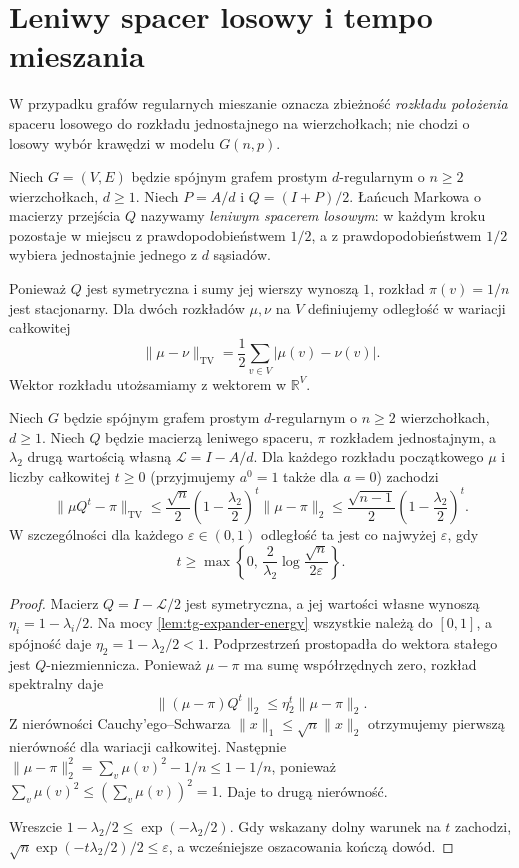 \section{Leniwy spacer losowy i tempo mieszania}
\label{sec:tg-expanders-random-walk}

W przypadku grafów regularnych mieszanie oznacza
zbieżność \emph{rozkładu położenia} spaceru losowego
do rozkładu jednostajnego na wierzchołkach;
nie chodzi o losowy wybór krawędzi
w modelu $G(n,p)$.

\begin{definicja}
\label{def:tg-expander-lazy-walk}
Niech $G=(V,E)$ będzie spójnym grafem
prostym $d$-regularnym o $n\geq2$
wierzchołkach, $d\geq1$.
Niech $P=A/d$ i
$Q=(I+P)/2$.
Łańcuch Markowa o macierzy przejścia
$Q$ nazywamy \emph{leniwym spacerem losowym}:
w każdym kroku pozostaje w miejscu
z prawdopodobieństwem $1/2$,
a z prawdopodobieństwem $1/2$
wybiera jednostajnie jednego
z $d$ sąsiadów.
\end{definicja}

Ponieważ $Q$ jest symetryczna
i sumy jej wierszy wynoszą $1$,
rozkład $\pi(v)=1/n$ jest
stacjonarny. Dla dwóch rozkładów
$\mu,\nu$ na $V$ definiujemy
odległość w wariacji całkowitej
\[
\|\mu-\nu\|_{\mathrm{TV}}
=\frac12\sum_{v\in V}|\mu(v)-\nu(v)|.
\]
Wektor rozkładu utożsamiamy
z wektorem w $\mathbb R^V$.

\begin{twierdzenie}
\label{thm:tg-expander-mixing}
Niech $G$ będzie spójnym grafem
prostym $d$-regularnym o $n\geq2$
wierzchołkach, $d\geq1$.
Niech $Q$ będzie macierzą
leniwego spaceru, $\pi$
rozkładem jednostajnym, a
$\lambda_2$ drugą wartością
własną $\mathcal L=I-A/d$.
Dla każdego rozkładu początkowego
$\mu$ i liczby całkowitej $t\geq0$
(przyjmujemy $a^0=1$ także dla $a=0$)
zachodzi
\[
\|\mu Q^t-\pi\|_{\mathrm{TV}}
\leq\frac{\sqrt n}{2}
\left(1-\frac{\lambda_2}{2}\right)^t
\|\mu-\pi\|_2
\leq\frac{\sqrt{n-1}}2
\left(1-\frac{\lambda_2}{2}\right)^t.
\]
W szczególności dla każdego
$\varepsilon\in(0,1)$
odległość ta jest co najwyżej
$\varepsilon$, gdy
\[
t\geq\max\left\{0,\,
\frac2{\lambda_2}
\log\frac{\sqrt n}{2\varepsilon}\right\}.
\]
\end{twierdzenie}
\begin{proof}
Macierz $Q=I-\mathcal L/2$
jest symetryczna, a jej
wartości własne wynoszą
$\eta_i=1-\lambda_i/2$.
Na mocy
\ref{lem:tg-expander-energy}
wszystkie należą do $[0,1]$,
a spójność daje
$\eta_2=1-\lambda_2/2<1$.
Podprzestrzeń prostopadła
do wektora stałego jest
$Q$-niezmiennicza.
Ponieważ $\mu-\pi$
ma sumę współrzędnych zero,
rozkład spektralny daje
\[
\|(\mu-\pi)Q^t\|_2
\leq\eta_2^t\|\mu-\pi\|_2.
\]
Z nierówności Cauchy'ego--Schwarza
$\|x\|_1\leq\sqrt n\|x\|_2$
otrzymujemy pierwszą nierówność
dla wariacji całkowitej.
Następnie
$\|\mu-\pi\|_2^2
=\sum_v\mu(v)^2-1/n
\leq1-1/n$,
ponieważ $\sum_v\mu(v)^2
\leq(\sum_v\mu(v))^2=1$.
Daje to drugą nierówność.

Wreszcie
$1-\lambda_2/2
\leq\exp(-\lambda_2/2)$.
Gdy wskazany dolny warunek
na $t$ zachodzi,
$\sqrt n\exp(-t\lambda_2/2)/2
\leq\varepsilon$,
a wcześniejsze oszacowania
kończą dowód.
\end{proof}

